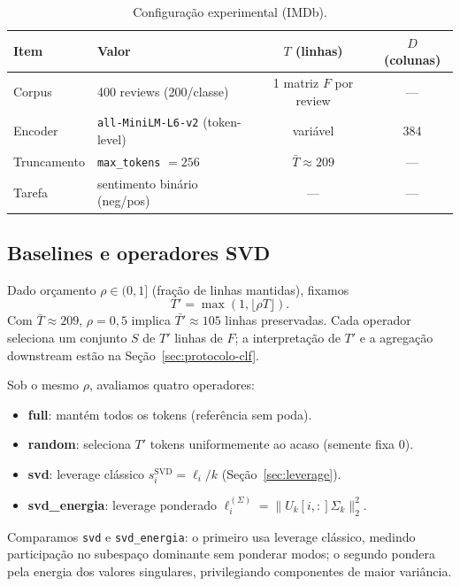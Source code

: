\begin{table}[ht]
    \centering
    \caption{Configuração experimental (IMDb).}
    \label{tab:modos}
    \begin{tabular}{llcc}
        \hline
        Item & Valor & $T$ (linhas) & $D$ (colunas) \\
        \hline
        Corpus & 400 reviews (200/classe) & 1 matriz $F$ por review & --- \\
        Encoder & \texttt{all-MiniLM-L6-v2} (token-level) & variável & 384 \\
        Truncamento & \texttt{max\_tokens} $= 256$ & $\bar{T} \approx 209$ & --- \\
        Tarefa & sentimento binário (neg/pos) & --- & --- \\
        \hline
    \end{tabular}
\end{table}

\subsection{Baselines e operadores SVD}\label{sec:baselines}

Dado orçamento $\rho \in (0,1]$ (fração de linhas mantidas), fixamos
$$
T' = \max\!\left(1, \lfloor \rho T \rfloor\right).
$$
Com $\bar{T}\approx 209$, $\rho=0{,}5$ implica $\bar{T'}\approx 105$ linhas preservadas. Cada operador seleciona um conjunto $S$ de $T'$ linhas de $F$; a interpretação de $T'$ e a agregação downstream estão na Seção~\ref{sec:protocolo-clf}.

Sob o mesmo $\rho$, avaliamos quatro operadores:

\begin{itemize}
    \item \textbf{full}: mantém todos os tokens (referência sem poda).
    \item \textbf{random}: seleciona $T'$ tokens uniformemente ao acaso (semente fixa 0).
    \item \textbf{svd}: leverage clássico $s_i^{\mathrm{SVD}} = \ell_i/k$ (Seção~\ref{sec:leverage}).
    \item \textbf{svd\_energia}: leverage ponderado $\ell_i^{(\Sigma)} = \|U_k[i,:]\Sigma_k\|_2^2$.
\end{itemize}

Comparamos \texttt{svd} e \texttt{svd\_energia}: o primeiro usa leverage clássico, medindo participação no subespaço dominante sem ponderar modos; o segundo pondera pela energia dos valores singulares, privilegiando componentes de maior variância.

